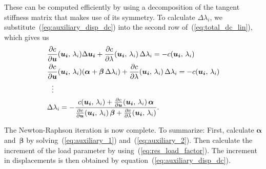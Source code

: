 These can be computed efficiently by using a decomposition of the tangent stiffness matrix that makes use of its symmetry.
To calculate $\Delta \lambda_i$, we substitute~(\ref{eq:auxiliary_disp_dc}) into the second row of~(\ref{eq:total_dc_lin}), which gives us
%
\begin{align}
&\frac{\partial c}{\partial \boldsymbol{u}}(\boldsymbol{u_{i}},\,\lambda_{i})\Delta\boldsymbol{u_{i}} + \frac{\partial c}{\partial \lambda}(\boldsymbol{u_{i}},\,\lambda_{i})\,\Delta \lambda_{i} = -c(\boldsymbol{u_{i}},\,\lambda_{i})\notag\\
&\frac{\partial c}{\partial \boldsymbol{u}}(\boldsymbol{u_{i}},\,\lambda_{i})(\boldsymbol{\alpha} + \boldsymbol{\beta}\,\Delta \lambda_{i}) + \frac{\partial c}{\partial \lambda}(\boldsymbol{u_{i}},\,\lambda_{i})\,\Delta \lambda_{i} = -c(\boldsymbol{u_{i}},\,\lambda_{i})\notag\\
&\ \ \vdots\notag\\
&\Delta \lambda_{i} = -\frac{c(\boldsymbol{u_{i}},\,\lambda_{i}) + \frac{\partial c}{\partial \boldsymbol{u}}(\boldsymbol{u_{i}},\,\lambda_{i})\,\boldsymbol{\alpha}}{\frac{\partial c}{\partial \boldsymbol{u}}(\boldsymbol{u_{i}},\,\lambda_{i})\,\boldsymbol{\beta} + \frac{\partial c}{\partial \lambda}(\boldsymbol{u_{i}},\,\lambda_{i})}.\label{eq:res_load_factor}
\end{align}

The Newton-Raphson iteration is now complete. To summarize: First, calculate $\boldsymbol{\alpha}$ and~$\boldsymbol{\beta}$ by solving~(\ref{eq:auxiliary_1}) and~(\ref{eq:auxiliary_2}). Then calculate the increment of the load parameter by using~(\ref{eq:res_load_factor}). The increment in displacements is then obtained by equation~(\ref{eq:auxiliary_disp_dc}).\\

